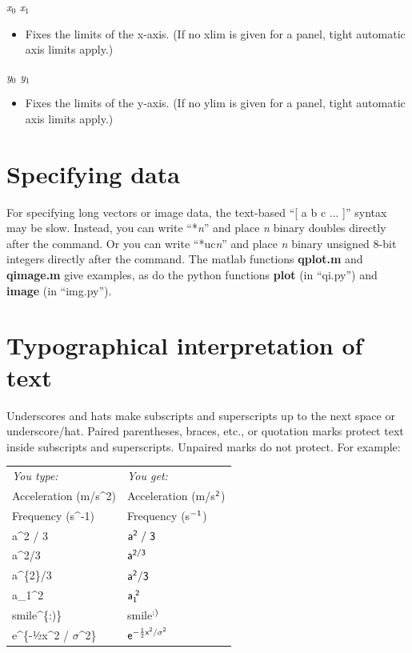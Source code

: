 \documentclass[11pt]{article}
\def\cmd#1#2{\noindent {\bf #1} #2\par}
\def\expl#1{\kern-8pt\begin{itemize}\item[]#1\end{itemize}}
\def\cref#1{{\bf #1}}
\begin{document}
\cmd{xlim}{\emph{x$_0$} \emph{x$_1$}}
\expl{Fixes the limits of the x-axis. (If no xlim is given for a panel, tight
  automatic axis limits apply.)}

\cmd{ylim}{\emph{y$_0$} \emph{y$_1$}}
\expl{Fixes the limits of the y-axis. (If no ylim is given for a panel, tight
  automatic axis limits apply.)}

\section{Specifying data}

For specifying long vectors or image data, the text-based ``[ a b
  c ... ]'' syntax may be slow. Instead, you can write
``*\emph{n}'' and place \emph{n} binary doubles directly after the
command. Or you can write ``*uc\emph{n}'' and place \emph{n} binary
unsigned 8-bit integers directly after the command. The matlab
functions \cref{qplot.m} and \cref{qimage.m} give examples, as do the
python functions \cref{plot} (in ``qi.py'') and \cref{image} (in ``img.py'').

\section{Typographical interpretation of text}

Underscores and hats make subscripts and superscripts
up to the next space or underscore/hat. Paired parentheses, braces,
etc., or quotation marks protect text inside subscripts and
superscripts. Unpaired marks do not protect. For example:\medskip

\begin{tabular}{ll}
  \emph{You type:} & \emph{You get:}\\
   Acceleration (m/s\^{}2) & \sf Acceleration (m/s$\sf^2$) \\
   Frequency (s\^{}-1) & \sf Frequency (s$\sf^{-1}$) \\
    a\^{}2 / 3 & $\sf a^{2}\;/\;3$ \\
    a\^{}2/3 & $\sf a^{2/3}$ \\
    a\^{}\{2\}/3 & $\sf a^{2}/3$ \\
    a\_{}1\^{}2 & $\sf a_1^{\;2}$ \\
    smile\^{}\{:)\} & \sf smile$\sf^{:)}$ \\
    e\^{}\{-½x\^{}2 / $\sigma$\^{}2\} & $\sf e^{-{\frac{1}{2}} x^2 / \sigma^2}$\\
    
  \end{tabular}\medskip
\end{document}
